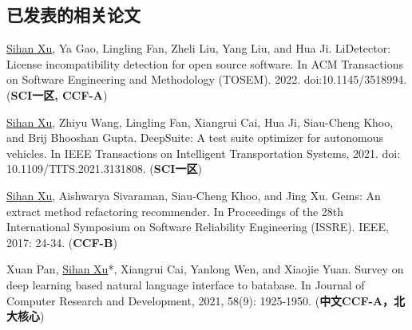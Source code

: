 \documentclass[a4paper,zihao=-4]{article}
\begin{document}
\subsection{已发表的相关论文}

\begin{enumerate}[label={[\arabic*]}]

	\item \underline{Sihan Xu}, Ya Gao, Lingling Fan, Zheli Liu, Yang Liu, and
	      Hua Ji. LiDetector: License incompatibility detection for open source
	      software. In ACM Transactions on Software Engineering and Methodology
	      (TOSEM). 2022. doi:10.1145/3518994. (\textbf{SCI一区, CCF-A})

	\item \underline{Sihan Xu}, Zhiyu Wang, Lingling Fan, Xiangrui Cai, Hua Ji,
	      Siau-Cheng Khoo, and Brij Bhooshan Gupta. DeepSuite: A test suite optimizer
	      for autonomous vehicles. In IEEE Transactions on Intelligent Transportation
	      Systems, 2021. doi: 10.1109/TITS.2021.3131808. (\textbf{SCI一区})

	\item \underline{Sihan Xu}, Aishwarya Sivaraman, Siau-Cheng Khoo, and Jing
	      Xu. Gems: An extract method refactoring recommender. In Proceedings of the
	      28th International Symposium on Software Reliability Engineering (ISSRE).
	      IEEE, 2017: 24-34. (\textbf{CCF-B})

	      \iffalse
	\item \underline{Sihan Xu}, Ya Gao, Xiangrui Cai, Zhiyu Wang, and Hua Ji.
	      Effective Multi-Fault Localization Based on Fault-Relevant Statistics. In
	      Proceedings of the 45th Annual Computers, Software, and Applications Conference
	      (COMPSAC). IEEE, 2021: 998-1003. (\textbf{CCF-C})

	\item \underline{Sihan Xu}, Sen Zhang, Weijing Wang, Xinya Cao, Chenkai Guo,
	      and Jing Xu. Method name suggestion with hierarchical attention
	      networks[C]//Proceedings of the 2019 ACM SIGPLAN Workshop on Partial
	      Evaluation and Program Manipulation (PEPM). 2019: 10-21. (\textbf{CCF-C})
	      \fi

	\item Xuan Pan, \underline{Sihan Xu}*, Xiangrui Cai, Yanlong Wen, and
	      Xiaojie Yuan. Survey on deep learning based natural language interface to
	      batabase. In Journal of Computer Research and Development, 2021, 58(9):
	      1925-1950. (\textbf{中文CCF-A，北大核心})


\end{enumerate}
\end{document}
